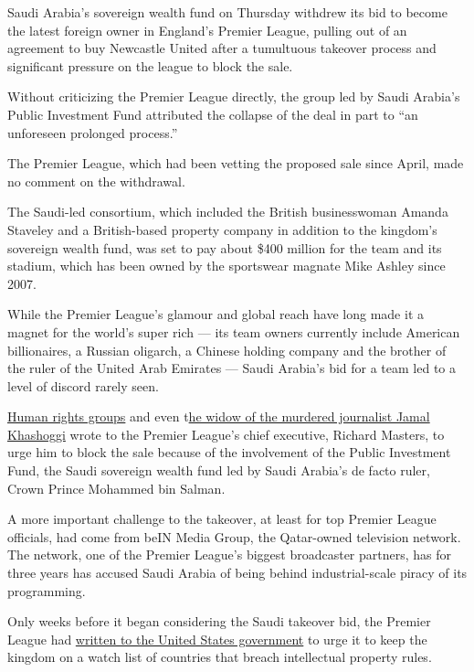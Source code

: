 Saudi Arabia's sovereign wealth fund on Thursday withdrew its bid to
become the latest foreign owner in England's Premier League, pulling out
of an agreement to buy Newcastle United after a tumultuous takeover
process and significant pressure on the league to block the sale.

Without criticizing the Premier League directly, the group led by Saudi
Arabia's Public Investment Fund attributed the collapse of the deal in
part to ``an unforeseen prolonged process.''

The Premier League, which had been vetting the proposed sale since
April, made no comment on the withdrawal.

The Saudi-led consortium, which included the British businesswoman
Amanda Staveley and a British-based property company in addition to the
kingdom's sovereign wealth fund, was set to pay about \$400 million for
the team and its stadium, which has been owned by the sportswear magnate
Mike Ashley since 2007.

While the Premier League's glamour and global reach have long made it a
magnet for the world's super rich --- its team owners currently include
American billionaires, a Russian oligarch, a Chinese holding company and
the brother of the ruler of the United Arab Emirates --- Saudi Arabia's
bid for a team led to a level of discord rarely seen.

\href{https://www.independent.co.uk/sport/football/premier-league/newcastle-takeover-human-rights-saudi-arabia-consortium-fa-disqualified-a9481361.html}{Human
rights groups} and even
t\href{https://www.theguardian.com/commentisfree/2020/may/18/saudi-regime-newcastle-united-jamal-khashoggi-mohammed-bin-salman}{he
widow of the murdered journalist Jamal Khashoggi} wrote to the Premier
League's chief executive, Richard Masters, to urge him to block the sale
because of the involvement of the Public Investment Fund, the Saudi
sovereign wealth fund led by Saudi Arabia's de facto ruler, Crown Prince
Mohammed bin Salman.

A more important challenge to the takeover, at least for top Premier
League officials, had come from beIN Media Group, the Qatar-owned
television network. The network, one of the Premier League's biggest
broadcaster partners, has for three years has accused Saudi Arabia of
being behind industrial-scale piracy of its programming.

Only weeks before it began considering the Saudi takeover bid, the
Premier League had
\href{https://www.nytimes.com/2020/04/30/sports/premier-league-saudi-arabia.html}{written
to the United States government} to urge it to keep the kingdom on a
watch list of countries that breach intellectual property rules.

